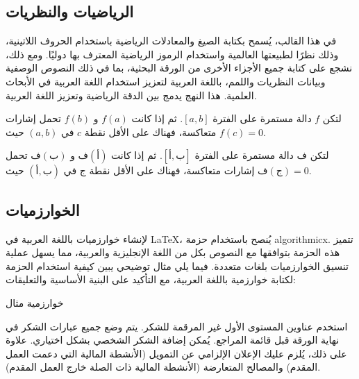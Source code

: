 \documentclass[12pt]{article}
\begin{document}
\subsection{الرياضيات والنظريات}
في هذا القالب، يُسمح بكتابة الصيغ والمعادلات الرياضية باستخدام الحروف اللاتينية، وذلك نظرًا لطبيعتها العالمية واستخدام الرموز الرياضية المعترف بها دوليًا. ومع ذلك، نشجع على كتابة جميع الأجزاء الأخرى من الورقة البحثية، بما في ذلك النصوص الوصفية وبيانات النظريات واللمم، باللغة العربية لتعزيز استخدام اللغة العربية في الأبحاث العلمية. هذا النهج يدمج بين الدقة الرياضية وتعزيز اللغة العربية.

\begin{theorem}
لتكن \( f \) دالة مستمرة على الفترة \([a, b]\). ثم إذا كانت \( f(a) \) و \( f(b) \) تحمل إشارات متعاكسة، فهناك على الأقل نقطة \( c \) في \((a, b)\) حيث \( f(c) = 0 \).
\end{theorem} 

\begin{theorem}
لتكن \( \text{ف} \) دالة مستمرة على الفترة \([\text{أ}, \text{ب}]\). ثم إذا كانت \( \text{ف}(\text{أ}) \) و \( \text{ف}(\text{ب}) \) تحمل إشارات متعاكسة، فهناك على الأقل نقطة \( \text{ج} \) في \((\text{أ}, \text{ب})\) حيث \( \text{ف}(\text{ج}) = 0 \).
\end{theorem}

\subsection{\textarabic{الخوارزميات}}
لإنشاء خوارزميات باللغة العربية في LaTeX، يُنصح باستخدام حزمة algorithmicx. تتميز هذه الحزمة بتوافقها مع النصوص بكل من اللغة الإنجليزية والعربية، مما يسهل عملية تنسيق الخوارزميات بلغات متعددة. فيما يلي مثال توضيحي يبين كيفية استخدام الحزمة لكتابة خوارزمية باللغة العربية، مع التأكيد على البنية الأساسية والتعليقات:

\begin{algorithm}
\caption{خوارزمية مثال}
\begin{algorithmic}[1]
   
\EndProcedure
\end{algorithmic}
\end{algorithm}

\begin{ack}
استخدم عناوين المستوى الأول غير المرقمة للشكر. يتم وضع جميع عبارات الشكر في نهاية الورقة قبل قائمة المراجع. يُمكن إضافة الشكر الشخصي بشكل اختياري. علاوة على ذلك، يُلزم عليك الإعلان الإلزامي عن التمويل (الأنشطة المالية التي دعمت العمل المقدم) والمصالح المتعارضة (الأنشطة المالية ذات الصلة خارج العمل المقدم).
\end{ack}
\end{document}
